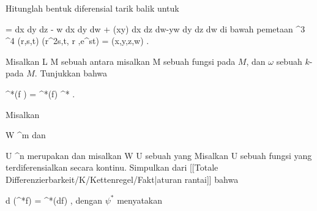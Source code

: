 {}
{

Hitunglah bentuk diferensial tarik balik
\mathl{\varphi^* \tau}{} untuk

\mavergleichskettedisp
{\vergleichskette
{ \tau
}
{ =} { dx \wedge dy \wedge dz - w dx \wedge dy \wedge dw + \cos (xy)  dx \wedge dz \wedge dw-yw dy \wedge dz \wedge dw
}
{ } {
}
{ } {
}
{ } {
}
}
{}{}{}
di bawah pemetaan
\maabbeledisp {\varphi} {\R^3} {\R^4
} {(r,s,t)} { (r^2s,t, \sin  r ,e^{st}) = (x,y,z,w)
} {.}

}
{} {}

{}
{

Misalkan
\maabbdisp {\psi} { L } { M
} {}
sebuah
antara
misalkan
 { M } {\R
} {}
sebuah fungsi pada $M$, dan $\omega$ sebuah
$k$-
pada $M$. Tunjukkan bahwa

\mavergleichskettedisp
{\vergleichskette
{ \psi^*(f \omega)
}
{ =} { \psi^*(f)  \psi^* \omega
}
{ } {
}
{ } {
}
{ } {
}
}
{}{}{.}

}
{} {}

{}
{

Misalkan

\mavergleichskette
{\vergleichskette
{ W
}
{ \subseteq }{ \R^m
}
{  }{
}
{    }{
}
{   }{
}
}
{}{}{}
dan

\mavergleichskette
{\vergleichskette
{ U
}
{ \subseteq }{ \R^n
}
{  }{
}
{    }{
}
{   }{
}
}
{}{}{}
merupakan
dan misalkan
\maabbdisp {\psi} { W } { U
} {}
sebuah
 yang
Misalkan
 { U } {\R
} {}
sebuah fungsi yang terdiferensialkan secara kontinu. Simpulkan dari
[[Totale Differenzierbarkeit/K/Kettenregel/Fakt|aturan rantai]]
bahwa

\mavergleichskettedisp
{\vergleichskette
{ d (\psi^*f)
}
{ =} { \psi^*(df)
}
{ } {
}
{ } {
}
{ } {
}
}
{}{}{,}
dengan $\psi^*$ menyatakan

}
{} {}


